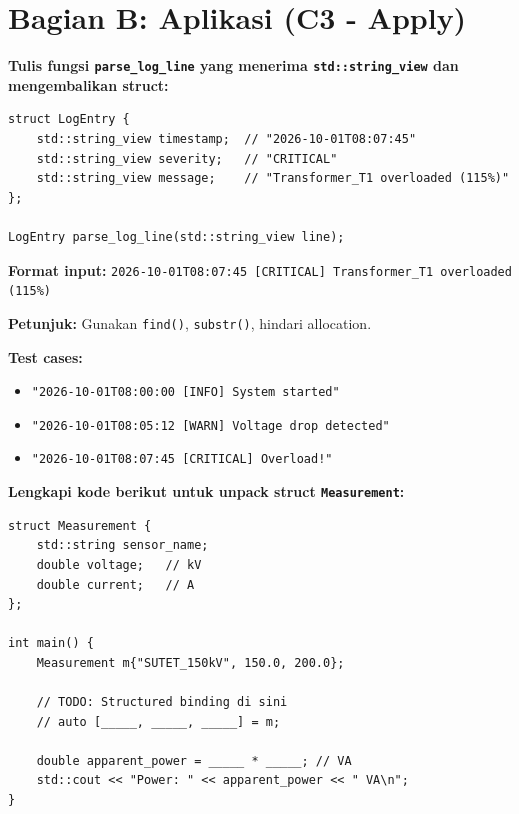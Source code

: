 \documentclass[12pt,a4paper]{article}
\begin{document}
\section*{Bagian B: Aplikasi (C3 - Apply)}

\begin{tcolorbox}[colback=UBgreen!5, colframe=UBgreen, title=\textbf{B1. Parsing Log Grid (C3: Apply)}]
\textbf{Tulis fungsi \texttt{parse\_log\_line} yang menerima \texttt{std::string\_view} dan mengembalikan struct:}

\begin{lstlisting}
struct LogEntry {
    std::string_view timestamp;  // "2026-10-01T08:07:45"
    std::string_view severity;   // "CRITICAL"
    std::string_view message;    // "Transformer_T1 overloaded (115%)"
};

LogEntry parse_log_line(std::string_view line);
\end{lstlisting}

\textbf{Format input:} \texttt{2026-10-01T08:07:45 [CRITICAL] Transformer_T1 overloaded (115\%)}

\textbf{Petunjuk:} Gunakan \texttt{find()}, \texttt{substr()}, hindari allocation.

\vspace{4cm}
\textbf{Test cases:}
\begin{itemize}
  \item \texttt{"2026-10-01T08:00:00 [INFO] System started"}
  \item \texttt{"2026-10-01T08:05:12 [WARN] Voltage drop detected"}
  \item \texttt{"2026-10-01T08:07:45 [CRITICAL] Overload!"}
\end{itemize}
\end{tcolorbox}

\vspace{0.5cm}

\begin{tcolorbox}[colback=UBgreen!5, colframe=UBgreen, title=\textbf{B2. Structured Binding (C3: Apply)}]
\textbf{Lengkapi kode berikut untuk unpack struct \texttt{Measurement}:}

\begin{lstlisting}
struct Measurement {
    std::string sensor_name;
    double voltage;   // kV
    double current;   // A
};

int main() {
    Measurement m{"SUTET_150kV", 150.0, 200.0};
    
    // TODO: Structured binding di sini
    // auto [_____, _____, _____] = m;
    
    double apparent_power = _____ * _____; // VA
    std::cout << "Power: " << apparent_power << " VA\n";
}
\end{lstlisting}
\end{tcolorbox}
\end{document}
